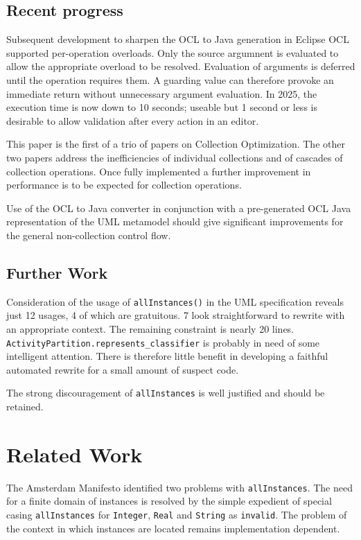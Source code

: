 \documentclass[
]{ceurart}
\begin{document}
\subsection{Recent progress}

Subsequent development to sharpen the OCL to Java generation in Eclipse OCL supported per-operation overloads. Only the source argumnent is evaluated to allow the appropriate overload to be resolved.  Evaluation of arguments is deferred until the operation requires them. A guarding value can therefore provoke an immediate return without unnecessary argument evaluation. In 2025, the execution time is now down to 10 seconds; useable but 1 second or less is desirable to allow validation after every action in an editor.

This paper is the first of a trio of papers on Collection Optimization. The other two papers address the inefficiencies of individual collections  \cite{Willink-Collections2} and of cascades \cite{Willink-Collections3} of collection operations.  Once fully implemented a further improvement in performance is to be expected for collection operations.

Use of the OCL to Java converter in conjunction with a pre-generated OCL Java representation of the UML metamodel should give significant improvements for the general non-collection control flow.

\subsection{Further Work}

Consideration of the usage of \verb!allInstances()! in the UML specification reveals just 12 usages, 4 of which are gratuitous. 7 look straightforward to rewrite with an appropriate context. The remaining constraint is nearly 20 lines. \verb!ActivityPartition.represents_classifier! is probably in need of some intelligent attention. There is therefore little benefit in developing a faithful automated rewrite for a small amount of suspect code.

The strong discouragement of \verb!allInstances! is well justified and should be retained.

\section{Related Work}\label{Related Work}

The Amsterdam Manifesto \cite{cook2002amsterdam} identified two problems with \verb!allInstances!. The need for a finite domain of instances is resolved by the simple expedient of special casing \verb!allInstances! for \verb!Integer!, \verb!Real! and  \verb!String! as \verb!invalid!. The problem of the context in which instances are located remains implementation dependent.
\end{document}
